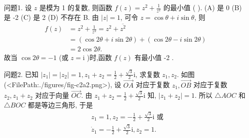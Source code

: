
问题1. 设 $z$ 是模为 1 的复数, 则函数 $f(z)=z^2+\frac{1}{z^2}$ 的最小值 ( ).
(A) 是 0
(B) 是 -2
(C) 是 2
(D) 不存在
B.
由 $|z|=1$, 可令 $z=\cos \theta+i \sin \theta$, 则
$$
\begin{aligned}
f(z) & =z^2+\frac{1}{z^2}=z^2+\overline{z^2} \\
& =(\cos 2 \theta+i \sin 2 \theta)+(\cos 2 \theta-i \sin 2 \theta) \\
& =2 \cos 2 \theta .
\end{aligned}
$$
故当 $\cos 2 \theta=-1$ (或 $z=\mathrm{i}$ )时,函数 $f(z)$ 有最小值 -2 .



问题2. 已知 $\left|z_1\right|=\left|z_2\right|=1, z_1+z_2=\frac{1}{2}+\frac{\sqrt{3}}{2} \mathrm{i}$, 求复数 $z_1, z_2$.
如图(<FilePath:./figures/fig-c2a2.png>), 设 $\overrightarrow{O A}$ 对应于复数 $z_1, \overrightarrow{O B}$ 对应于复数 $z_2, z_1+z_2$ 对应于向量 $\overrightarrow{O C}$.
由 $z_1+z_2=\frac{1}{2}+\frac{\sqrt{3}}{2} \mathrm{i}$ 知, $\left|z_1+z_2\right|=1$. 所以 $\triangle A O C$ 和 $\triangle B O C$ 都是等边三角形, 于是
$$
\begin{aligned}
& z_1=1, z_2=-\frac{1}{2}+\frac{\sqrt{3}}{2} \mathrm{i} \text { 或 } \\
& \dot{z}_1=-\frac{1}{2}+\frac{\sqrt{3}}{2} \mathrm{i}, z_2=1 .
\end{aligned}
$$



